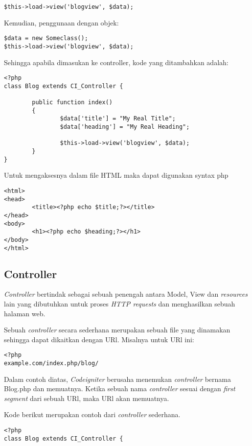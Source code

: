 \begin{enumerate}
\begin{lstlisting}[label=phpheg, frame=single]
$this->load->view('blogview', $data);
\end{lstlisting}

Kemudian, penggunaan dengan objek:
\begin{lstlisting}[label=phpheg, frame=single] 
$data = new Someclass();
$this->load->view('blogview', $data);
\end{lstlisting}

Sehingga apabila dimasukan ke controller, kode yang ditambahkan adalah:
\begin{lstlisting}[label=phpheg, frame=single] 
<?php
class Blog extends CI_Controller {

        public function index()
        {
                $data['title'] = "My Real Title";
                $data['heading'] = "My Real Heading";

                $this->load->view('blogview', $data);
        }
}
\end{lstlisting}

Untuk mengaksesnya dalam file HTML maka dapat digunakan syntax php
\begin{lstlisting}[frame=single] 
<html>
<head>
        <title><?php echo $title;?></title>
</head>
<body>
        <h1><?php echo $heading;?></h1>
</body>
</html>
\end{lstlisting}

\subsection{Controller}
\label{subs:controller}
\textit{Controller} bertindak sebagai sebuah penengah antara Model, View dan \textit{resources} lain yang dibutuhkan untuk proses \textit{HTTP requests} dan menghasilkan sebuah halaman web.

Sebuah \textit{controller} secara sederhana merupakan sebuah file yang dinamakan sehingga dapat dikaitkan dengan URl.
Misalnya untuk URl ini:
\begin{lstlisting}[label=phpheg, frame=single] 
<?php
example.com/index.php/blog/
\end{lstlisting}

Dalam contoh diatas, \textit{Codeigniter} berusaha menemukan \textit{controller} bernama Blog.php dan memuatnya. Ketika sebuah nama \textit{controller} sesuai dengan \textit{first segment} dari sebuah URl, maka URl akan memuatnya.

Kode berikut merupakan contoh dari \textit{controller} sederhana.
\begin{lstlisting}[label=phpheg, frame=single] 
<?php
class Blog extends CI_Controller {


\end{lstlisting}
\end{enumerate}
